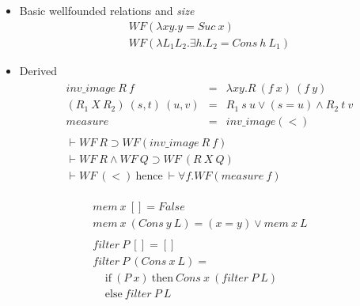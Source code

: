\begin{slide}
\begin{itemize}
\item Basic wellfounded relations and {\it size}
\begin{eqnarray*}
   WF (\lambda x y. y = Suc\ x) \\
   WF (\lambda L_1 L_2. \exists h. L_2 = Cons\ h\ L_1)
\end{eqnarray*}

\item Derived
\begin{eqnarray*}
  \begin{array}{rcl}
  inv\_image\ R\ f & = & \lambda x y. R\ (f\ x)\ (f\ y) \\
  (R_1\ X\ R_2)\ (s,t)\ (u,v) & = & R_1\ s\ u \lor (s = u) \land R_2\ t\ v \\
  measure & = & inv\_image (<)
  \end{array} \\
  \begin{array}{l}
  \vdash WF\ R \supset WF (inv\_image\ R\ f) \\
  \vdash WF\ R \land WF\ Q \supset WF\ (R\ X\ Q) \\
  \vdash WF\ (<)\   \mbox{hence}\ \vdash \forall f. WF(measure\ f)
  \end{array}
\end{eqnarray*}
\end{itemize}
\end{slide}

\begin{slide}
\[
\begin{array}{l}
mem\ x\ [] = False\\
mem\ x\ (Cons\ y\ L) = (x=y) \lor mem\ x\ L \\
\\
filter\ P\ [] = [] \\
filter\ P\ (Cons\ x\ L) = \\
{~~~~~}   \mbox{if}\ (P\ x)\ \mbox{then}\ Cons\ x\ (filter\ P\ L) \\
{~~~~~}   \mbox{else}\ filter\ P\ L
\end{array}
\]
\end{slide}

